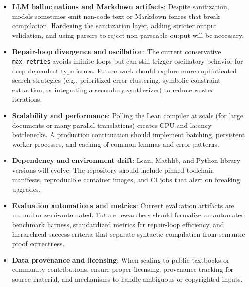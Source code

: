 \begin{itemize}
    \item \textbf{LLM hallucinations and Markdown artifacts}: Despite sanitization, models sometimes emit non-code text or Markdown fences that break compilation. Hardening the sanitization layer, adding stricter output validation, and using parsers to reject non-parseable output will be necessary.
    \item \textbf{Repair-loop divergence and oscillation}: The current conservative \texttt{max\_retries} avoids infinite loops but can still trigger oscillatory behavior for deep dependent-type issues. Future work should explore more sophisticated search strategies (e.g., prioritized error clustering, symbolic constraint extraction, or integrating a secondary synthesizer) to reduce wasted iterations.
    \item \textbf{Scalability and performance}: Polling the Lean compiler at scale (for large documents or many parallel translations) creates CPU and latency bottlenecks. A production continuation should implement batching, persistent worker processes, and caching of common lemmas and error patterns.
    \item \textbf{Dependency and environment drift}: Lean, Mathlib, and Python library versions will evolve. The repository should include pinned toolchain manifests, reproducible container images, and CI jobs that alert on breaking upgrades.
    \item \textbf{Evaluation automations and metrics}: Current evaluation artifacts are manual or semi-automated. Future researchers should formalize an automated benchmark harness, standardized metrics for repair-loop efficiency, and hierarchical success criteria that separate syntactic compilation from semantic proof correctness.
    \item \textbf{Data provenance and licensing}: When scaling to public textbooks or community contributions, ensure proper licensing, provenance tracking for source material, and mechanisms to handle ambiguous or copyrighted inputs.
\end{itemize}
